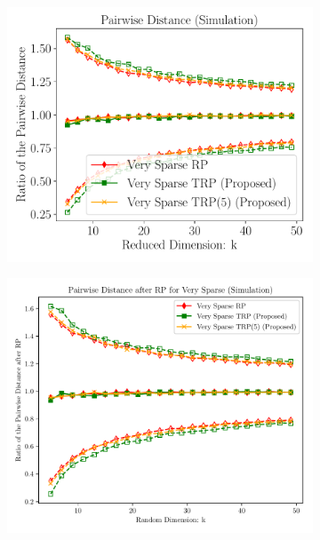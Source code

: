 \begin{figure}[ht!] 
	\centering
	\begin{subfigure}{0.32\textwidth}
		\includegraphics[scale = 0.3]{figure/dist_sp1_d2500.pdf}
	\end{subfigure}
	\begin{subfigure}{0.32\textwidth}
		\includegraphics[scale = 0.3]{figure/dist_sp1_d10000.pdf}
	\end{subfigure}
	\begin{subfigure}{0.32\textwidth}

\end{subfigure}
\end{figure}
